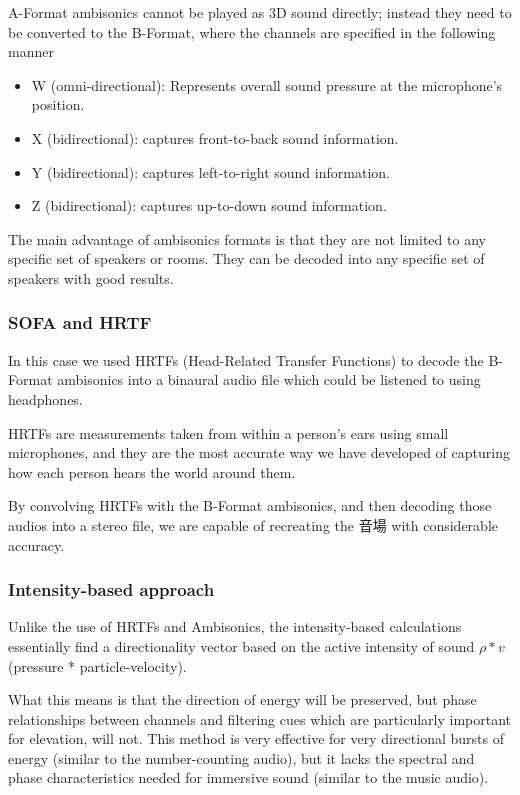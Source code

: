 \documentclass[a4paper, 12pt]{article}
\begin{document}
A-Format ambisonics cannot be played as 3D sound directly; instead they need to be converted to the B-Format, where the channels are specified in the following manner

\begin{itemize}
    \item W (omni-directional): Represents overall sound pressure at the microphone's position.
    \item X (bidirectional): captures front-to-back sound information.
    \item Y (bidirectional): captures left-to-right sound information.
    \item Z (bidirectional): captures up-to-down sound information.
\end{itemize}

The main advantage of ambisonics formats is that they are not limited to any specific set of speakers or rooms. They can be decoded into any specific set of speakers with good results.

\subsubsection{SOFA and HRTF}

In this case we used HRTFs (Head-Related Transfer Functions) to decode the B-Format ambisonics into a binaural audio file which could be listened to using headphones. \cite{ling2023implementation} 

HRTFs are measurements taken from within a person's ears using small microphones, and they are the most accurate way we have developed of capturing how each person hears the world around them.

By convolving HRTFs with the B-Format ambisonics, and then decoding those audios into a stereo file, we are capable of recreating the 音場 with considerable accuracy. 

\subsubsection{Intensity-based approach}

Unlike the use of HRTFs and Ambisonics, the intensity-based calculations essentially find a directionality vector based on the active intensity of sound $\rho * v$ (pressure * particle-velocity). 

What this means is that the direction of energy will be preserved, but phase relationships between channels and filtering cues which are particularly important for elevation, will not. This method is very effective for very directional bursts of energy (similar to the number-counting audio), but it lacks the spectral and phase characteristics needed for immersive sound (similar to the music audio).
\end{document}
